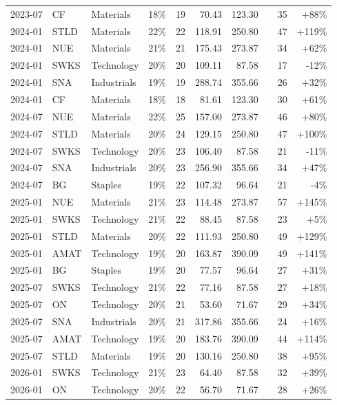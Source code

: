\documentclass[11pt,a4paper]{article}
\begin{document}
{\begin{longtable}{l l l r r r r r r r}
2023-07 & CF & Materials & 18\% & 19 & 70.43 & 123.30 &  & 35 & +88\% \\
2024-01 & STLD & Materials & 22\% & 22 & 118.91 & 250.80 &  & 47 & +119\% \\
2024-01 & NUE & Materials & 21\% & 21 & 175.43 & 273.87 &  & 34 & +62\% \\
2024-01 & SWKS & Technology & 20\% & 20 & 109.11 & 87.58 &  & 17 & -12\% \\
2024-01 & SNA & Industrials & 19\% & 19 & 288.74 & 355.66 &  & 26 & +32\% \\
2024-01 & CF & Materials & 18\% & 18 & 81.61 & 123.30 &  & 30 & +61\% \\
2024-07 & NUE & Materials & 22\% & 25 & 157.00 & 273.87 &  & 46 & +80\% \\
2024-07 & STLD & Materials & 20\% & 24 & 129.15 & 250.80 &  & 47 & +100\% \\
2024-07 & SWKS & Technology & 20\% & 23 & 106.40 & 87.58 &  & 21 & -11\% \\
2024-07 & SNA & Industrials & 20\% & 23 & 256.90 & 355.66 &  & 34 & +47\% \\
2024-07 & BG & Staples & 19\% & 22 & 107.32 & 96.64 &  & 21 & -4\% \\
2025-01 & NUE & Materials & 21\% & 23 & 114.48 & 273.87 &  & 57 & +145\% \\
2025-01 & SWKS & Technology & 21\% & 22 & 88.45 & 87.58 &  & 23 & +5\% \\
2025-01 & STLD & Materials & 20\% & 22 & 111.93 & 250.80 &  & 49 & +129\% \\
2025-01 & AMAT & Technology & 19\% & 20 & 163.87 & 390.09 &  & 49 & +141\% \\
2025-01 & BG & Staples & 19\% & 20 & 77.57 & 96.64 &  & 27 & +31\% \\
2025-07 & SWKS & Technology & 21\% & 22 & 77.16 & 87.58 &  & 27 & +18\% \\
2025-07 & ON & Technology & 20\% & 21 & 53.60 & 71.67 &  & 29 & +34\% \\
2025-07 & SNA & Industrials & 20\% & 21 & 317.86 & 355.66 &  & 24 & +16\% \\
2025-07 & AMAT & Technology & 19\% & 20 & 183.76 & 390.09 &  & 44 & +114\% \\
2025-07 & STLD & Materials & 19\% & 20 & 130.16 & 250.80 &  & 38 & +95\% \\
2026-01 & SWKS & Technology & 21\% & 23 & 64.40 & 87.58 &  & 32 & +39\% \\
2026-01 & ON & Technology & 20\% & 22 & 56.70 & 71.67 &  & 28 & +26\% \\

\end{longtable}}
\end{document}
